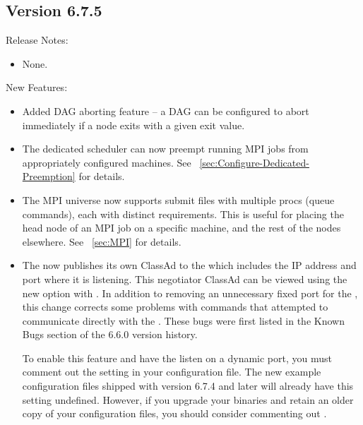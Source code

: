 \subsection{\label{sec:New-6-7-5}Version 6.7.5}
\noindent Release Notes:

\begin{itemize}

\item None.

\end{itemize}


\noindent New Features:

\begin{itemize}

\item Added DAG aborting feature -- a DAG can be configured to
abort immediately if a node exits with a given exit value.

\item The dedicated scheduler can now preempt running MPI jobs from 
appropriately configured machines. See 
~\ref{sec:Configure-Dedicated-Preemption} for details.

\item The MPI universe now supports submit files with multiple procs (queue 
commands), each with distinct requirements.  This is useful for placing
the head node of an MPI job on a specific machine, and the rest of the 
nodes elsewhere. See ~\ref{sec:MPI} for details.

\item The  now publishes its own ClassAd to the
   which includes the IP address and port where it
  is listening.
  This negotiator ClassAd can be viewed using the new
   option with .
  In addition to removing an unnecessary fixed port for the
  , this change corrects some problems with
  commands that attempted to communicate directly with the
  .
  These bugs were first listed in the Known Bugs section of the 6.6.0
  version history.

  To enable this feature and have the  listen on a
  dynamic port, you must comment out the 
  setting in your configuration file.
  The new example configuration files shipped with version 6.7.4 and
  later will already have this setting undefined.
  However, if you upgrade your binaries and retain an older copy of
  your configuration files, you should consider commenting out 
  .


\end{itemize}
